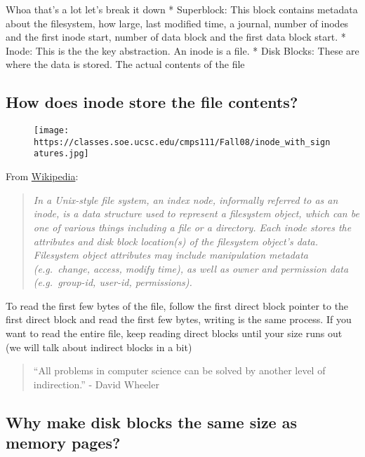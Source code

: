 Whoa that's a lot let's break it down * Superblock: This block contains
metadata about the filesystem, how large, last modified time, a journal,
number of inodes and the first inode start, number of data block and the
first data block start. * Inode: This is the the key abstraction. An
inode is a file. * Disk Blocks: These are where the data is stored. The
actual contents of the file

\subsection{How does inode store the file
contents?}\label{how-does-inode-store-the-file-contents}

\begin{figure}[htbp]
\centering
\texttt{[image: https://classes.soe.ucsc.edu/cmps111/Fall08/inode\_with\_signatures.jpg]}
\caption{}
\end{figure}

From \href{http://en.wikipedia.org/wiki/Inode}{Wikipedia}:

\begin{quote}
\emph{In a Unix-style file system, an index node, informally referred to
as an inode, is a data structure used to represent a filesystem object,
which can be one of various things including a file or a directory. Each
inode stores the attributes and disk block location(s) of the filesystem
object's data. Filesystem object attributes may include manipulation
metadata (e.g.~change, access, modify time), as well as owner and
permission data (e.g.~group-id, user-id, permissions).}
\end{quote}

To read the first few bytes of the file, follow the first direct block
pointer to the first direct block and read the first few bytes, writing
is the same process. If you want to read the entire file, keep reading
direct blocks until your size runs out (we will talk about indirect
blocks in a bit)

\begin{quote}
``All problems in computer science can be solved by another level of
indirection.'' - David Wheeler
\end{quote}

\subsection{Why make disk blocks the same size as memory
pages?}\label{why-make-disk-blocks-the-same-size-as-memory-pages}

